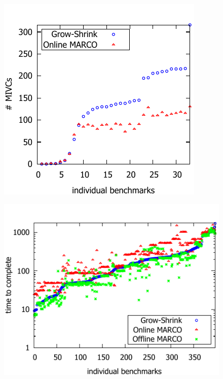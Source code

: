\begin{figure}[!t]
\centering
\begin{minipage}{.4\textwidth}
\centering
\includegraphics[scale=0.8]{./plots/found_mivcs.pdf}%
%
\label{res:found_mivcs}
\end{minipage}\hfill
\begin{minipage}{.52\textwidth}
\centering
\includegraphics[scale=0.8]{./plots/time_to_complete.pdf}%
%
\label{res:time_to_complete}
\end{minipage}
\end{figure}




